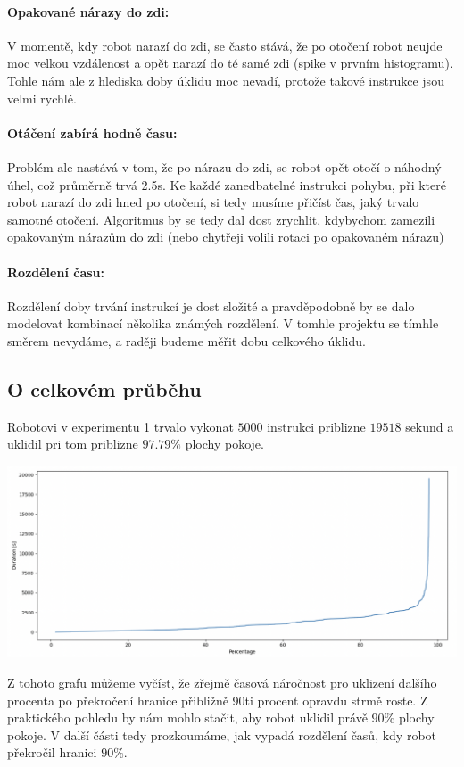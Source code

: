 \documentclass[11pt]{article}
\begin{document}
\paragraph{Opakované nárazy do zdi:} V momentě, kdy robot narazí do zdi, se často stává, že po otočení robot neujde moc velkou vzdálenost a opět narazí do té samé zdi (spike v prvním histogramu). Tohle nám ale z hlediska doby úklidu moc nevadí, protože takové instrukce jsou velmi rychlé.

\paragraph{Otáčení zabírá hodně času:} Problém ale nastává v tom, že po nárazu do zdi, se robot opět otočí o náhodný úhel, což průměrně trvá 2.5s. Ke každé zanedbatelné instrukci pohybu, při které robot narazí do zdi hned po otočení, si tedy musíme přičíst čas, jaký trvalo samotné otočení. Algoritmus by se tedy dal dost zrychlit, kdybychom zamezili opakovaným nárazům do zdi (nebo chytřeji volili rotaci po opakovaném nárazu)

\paragraph{Rozdělení času:} Rozdělení doby trvání instrukcí je dost složité a pravděpodobně by se dalo modelovat kombinací několika známých rozdělení. V tomhle projektu se tímhle směrem nevydáme, a raději budeme měřit dobu celkového úklidu.
\subsection{O celkovém průběhu}
Robotovi v experimentu 1 trvalo vykonat $5000$ instrukci priblizne $19518$ sekund a uklidil pri tom priblizne $97.79\%$ plochy pokoje. 
\begin{center}
	\includegraphics[scale=0.34]{Images/DurationPercentageSingle.png}
\end{center}
Z tohoto grafu můžeme vyčíst, že zřejmě časová náročnost pro uklizení dalšího procenta po překročení hranice přibližně 90ti procent opravdu strmě roste. Z praktického pohledu by nám mohlo stačit, aby robot uklidil právě $90\%$ plochy pokoje. V další části tedy prozkoumáme, jak vypadá rozdělení časů, kdy robot překročil hranici $90\%$.
\end{document}
